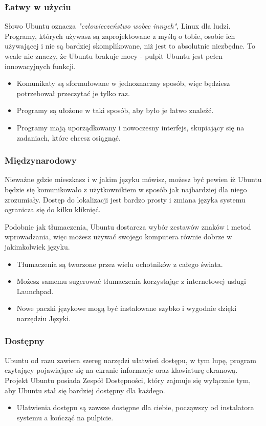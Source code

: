 \subsubsection{Łatwy w użyciu}
Słowo Ubuntu oznacza \emph{"człowieczeństwo wobec innych"}, Linux dla ludzi. Programy, których używasz są zaprojektowane z myślą o tobie, osobie ich używającej i nie są bardziej skomplikowane, niż jest to absolutnie niezbędne. To wcale nie znaczy, że Ubuntu brakuje mocy - pulpit Ubuntu jest pełen innowacyjnych funkcji.
\begin{itemize}
\item Komunikaty są sformułowane w jednoznaczny sposób, więc będziesz potrzebował przeczytać je tylko raz.
\item Programy są ułożone w taki sposób, aby było je łatwo znaleźć.
\item Programy mają uporządkowany i nowoczesny interfejs, skupiający się na zadaniach, które chcesz osiągnąć.
\end{itemize}
\subsubsection{Międzynarodowy}
Nieważne gdzie mieszkasz i w jakim języku mówisz, możesz być pewien iż Ubuntu będzie się komunikowało z użytkownikiem w sposób jak najbardziej dla niego zrozumiały. Dostęp do lokalizacji jest bardzo prosty i zmiana języka systemu ogranicza się do kilku kliknięć. 

Podobnie jak tłumaczenia, Ubuntu dostarcza wybór zestawów znaków i metod wprowadzania, więc możesz używać swojego komputera równie dobrze w jakimkolwiek języku.
\begin{itemize}
\item Tłumaczenia są tworzone przez wielu ochotników z całego świata.
\item Możesz samemu sugerować tłumaczenia korzystając z internetowej usługi Launchpad.
\item Nowe paczki językowe mogą być instalowane szybko i wygodnie dzięki narzędziu Języki.
\end{itemize}
\subsubsection{Dostępny}
Ubuntu od razu zawiera szereg narzędzi ułatwień dostępu, w tym lupę, program czytający pojawiające się na ekranie informacje oraz klawiaturę ekranową. Projekt Ubuntu posiada Zespół Dostępności, który zajmuje się wyłącznie tym, aby Ubuntu stał się bardziej dostępny dla każdego.
\begin{itemize}
\item Ułatwienia dostępu są zawsze dostępne dla ciebie, począwszy od instalatora systemu a kończąć na pulpicie.
\end{itemize}

